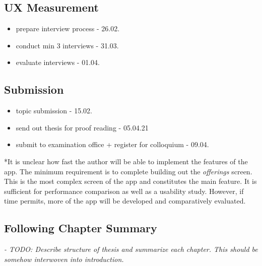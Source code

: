 \subsection{UX Measurement}
\begin{itemize}
    \item prepare interview process - 26.02.
    \item conduct min 3 interviews - 31.03.
    \item evaluate interviews - 01.04.
\end{itemize}

\subsection{Submission}
\begin{itemize}
    \item topic submission - 15.02.
    \item send out thesis for proof reading - 05.04.21
    \item submit to examination office + register for colloquium - 09.04.
\end{itemize}

*It is unclear how fast the author will be able to implement the features of the app. 
The minimum requirement is to complete building out the \textit{offerings} screen. 
This is the most complex screen of the app and constitutes the main feature. 
It is sufficient for performance comparison as well as a usability study. 
However, if time permits, more of the app will be developed and comparatively evaluated. \\

\subsection{Following Chapter Summary}
\textit{- TODO: Describe structure of thesis and summarize each chapter. 
This should be somehow interwoven into introduction.}